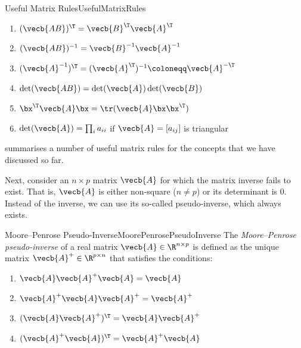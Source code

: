 \begin{thm}{Useful Matrix Rules}{UsefulMatrixRules}
	\begin{enumerate}
		\item $(\vecb{AB})^\T = \vecb{B}^\T \vecb{A}^\T$
		\item $(\vecb{AB})^{-1} = \vecb{B}^{-1} \vecb{A}^{-1}$
		\item $(\vecb{A}^{-1})^\T = (\vecb{A}^\T)^{-1} \coloneqq \vecb{A}^{-\T}$
		\item $\det(\vecb{AB}) = \det(\vecb{A}) \det(\vecb{B})$
		\item $\bx^\T \vecb{A} \bx = \tr(\vecb{A} \bx \bx^\T)$
		\item $\det(\vecb{A}) = \prod_i a_{ii}$ if $\vecb{A} = [a_{ij}]$ is triangular
	\end{enumerate}
\end{thm}

 summarises a number of useful matrix rules for the concepts that we have discussed so far.

Next, consider an $n \times p$ matrix $\vecb{A}$ for which the matrix inverse fails to exist. That is, $\vecb{A}$ is either non-square ($n \neq p$) or its determinant is 0. Instead of the inverse, we can use its so-called pseudo-inverse, which always exists.

\begin{defn}{Moore--Penrose Pseudo-Inverse}{MoorePenrosePseudoInverse}
	The \textit{Moore--Penrose pseudo-inverse} of a real matrix $\vecb{A} \in \R^{n \times p}$ is defined as the unique matrix $\vecb{A}^+ \in \R^{p \times n}$ that satisfies the conditions:
	\begin{enumerate}
		\item $\vecb{A} \vecb{A}^+ \vecb{A} = \vecb{A}$
		\item $\vecb{A}^+ \vecb{A} \vecb{A}^+ = \vecb{A}^+$
		\item $(\vecb{A} \vecb{A}^+)^\T = \vecb{A} \vecb{A}^+$
		\item $(\vecb{A}^+ \vecb{A})^\T = \vecb{A}^+ \vecb{A}$
	\end{enumerate}
\end{defn}

